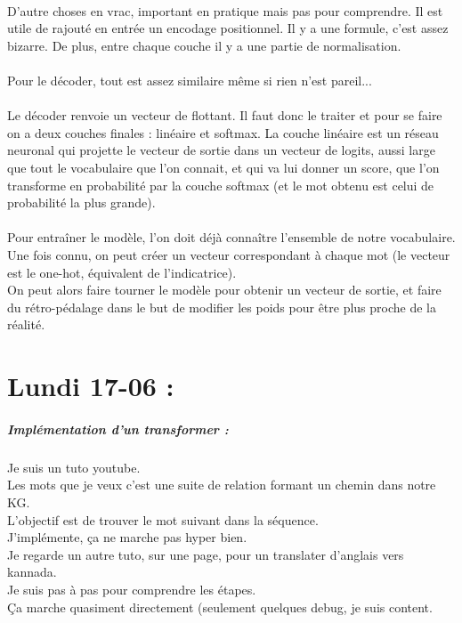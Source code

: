 \documentclass{article}
\begin{document}
\\
D'autre choses en vrac, important en pratique mais pas pour comprendre. Il est utile de rajouté en entrée un encodage positionnel. Il y a une formule, c'est assez bizarre. De plus, entre chaque couche il y a une partie de normalisation.\\
\\
Pour le décoder, tout est assez similaire même si rien n'est pareil...\\
\\
Le décoder renvoie un vecteur de flottant. Il faut donc le traiter et pour se faire on a deux couches finales : linéaire et softmax. La couche linéaire est un réseau neuronal qui projette le vecteur de sortie dans un vecteur de logits, aussi large que tout le vocabulaire que l'on connait, et qui va lui donner un score, que l'on transforme en probabilité par la couche softmax (et le mot obtenu est celui de probabilité la plus grande).\\
\\
Pour entraîner le modèle, l'on doit déjà connaître l'ensemble de notre vocabulaire. Une fois connu, on peut créer un vecteur correspondant à chaque mot (le vecteur est le one-hot, équivalent de l'indicatrice).\\
On peut alors faire tourner le modèle pour obtenir un vecteur de sortie, et faire du rétro-pédalage dans le but de modifier les poids pour être plus proche de la réalité.\\

\section*{Lundi 17-06 :}
\subparagraph*{Implémentation d'un transformer :}
Je suis un tuto youtube.\\
Les mots que je veux c'est une suite de relation formant un chemin dans notre KG.\\
L'objectif est de trouver le mot suivant dans la séquence.\\
J'implémente, ça ne marche pas hyper bien.\\
Je regarde un autre tuto, sur une page, pour un translater d'anglais vers kannada.\\
Je suis pas à pas pour comprendre les étapes.\\
Ça marche quasiment directement (seulement quelques debug, je suis content.
\end{document}
